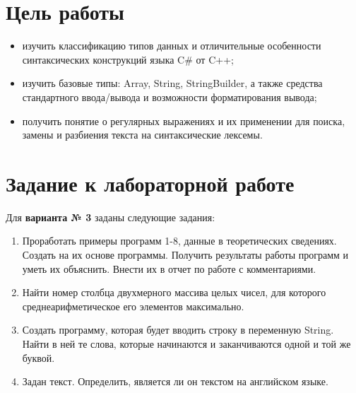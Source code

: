 \documentclass[a4paper,14pt]{extarticle}
\begin{document}

    \section{Цель работы}

    \begin{itemize}
        
        \item изучить классификацию типов данных и отличительные 
              особенности синтаксических конструкций языка C\# от C++;

        \item изучить базовые типы: Array, String, StringBuilder, а также
              средства стандартного ввода/вывода и возможности форматирования
              вывода;

        \item получить понятие о регулярных выражениях и их применении
              для поиска, замены и разбиения текста на синтаксические лексемы.

    \end{itemize}

    \section{Задание к лабораторной работе}

    Для \textbf{варианта № 3} заданы следующие задания:
    
    \begin{enumerate}
        
        \item Проработать примеры программ 1-8, данные в теоретических сведениях.
              Создать на их основе программы. Получить результаты работы программ
              и уметь их объяснить. Внести их в отчет по работе с комментариями.

        \item Найти номер столбца двухмерного массива целых чисел, для которого
              среднеарифметическое его элементов максимально.
              
        \item Создать программу, которая будет вводить строку в переменную String.
              Найти в ней те слова, которые начинаются и заканчиваются одной и 
              той же буквой.

        \item Задан текст. Определить, является ли он текстом на английском языке.

    \end{enumerate}
    
\end{document}
